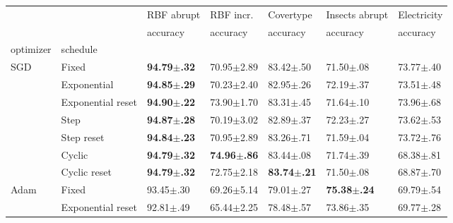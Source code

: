 \begin{tabular}{lllllll}
    \toprule
                             &                   & RBF abrupt              & RBF incr.               & Covertype               & Insects abrupt          & Electricity             \\
                             &                   & accuracy                & accuracy                & accuracy                & accuracy                & accuracy                \\
    optimizer                & schedule          &                         &                         &                         &                         &                         \\
    \midrule
    \multirow[c]{7}{*}{SGD}  & Fixed             & \bfseries 94.79$\pm$.32 & 70.95$\pm$2.89          & 83.42$\pm$.50           & 71.50$\pm$.08           & 73.77$\pm$.40           \\
                             & Exponential       & \bfseries 94.85$\pm$.29 & 70.23$\pm$2.40          & 82.95$\pm$.26           & 72.19$\pm$.37           & 73.51$\pm$.48           \\
                             & Exponential reset & \bfseries 94.90$\pm$.22 & 73.90$\pm$1.70          & 83.31$\pm$.45           & 71.64$\pm$.10           & 73.96$\pm$.68           \\
                             & Step              & \bfseries 94.87$\pm$.28 & 70.19$\pm$3.02          & 82.89$\pm$.37           & 72.23$\pm$.27           & 73.62$\pm$.53           \\
                             & Step reset        & \bfseries 94.84$\pm$.23 & 70.95$\pm$2.89          & 83.26$\pm$.71           & 71.59$\pm$.04           & 73.72$\pm$.76           \\
                             & Cyclic            & \bfseries 94.79$\pm$.32 & \bfseries 74.96$\pm$.86 & 83.44$\pm$.08           & 71.74$\pm$.39           & 68.38$\pm$.81           \\
                             & Cyclic reset      & \bfseries 94.79$\pm$.32 & 72.75$\pm$2.18          & \bfseries 83.74$\pm$.21 & 71.50$\pm$.08           & 68.87$\pm$.70           \\
    \multirow[c]{4}{*}{Adam} & Fixed             & 93.45$\pm$.30           & 69.26$\pm$5.14          & 79.01$\pm$.27           & \bfseries 75.38$\pm$.24 & 69.79$\pm$.54           \\
                             & Exponential reset & 92.81$\pm$.49           & 65.44$\pm$2.25          & 78.48$\pm$.57           & 73.86$\pm$.35           & 69.77$\pm$.28           \\

\end{tabular}
